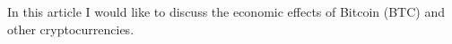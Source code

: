 \documentclass[draft.tex]{subfiles}
\begin{document}
In this article I would like to discuss the economic effects of Bitcoin (BTC) and other cryptocurrencies.
\end{document}

